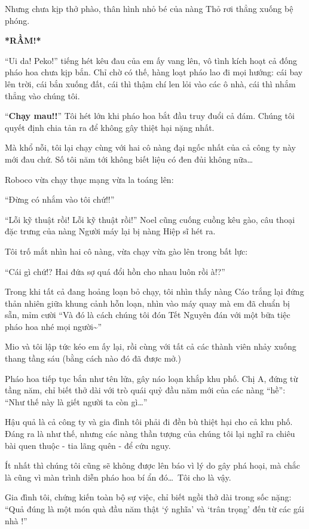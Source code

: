 \documentclass[../main.tex]{subfiles}
\begin{document}
Nhưng chưa kịp thở phào, thân hình nhỏ bé của nàng Thỏ rơi thẳng xuống bệ phóng.

\textbf{*RẦM!*}

``Ui da! Peko!'' tiếng hét kêu đau của em ấy vang lên, vô tình kích hoạt cả đống pháo hoa chưa kịp bắn. Chỉ chờ có thế, hàng loạt pháo lao đi mọi hướng: cái bay lên trời, cái bắn xuống đất, cái thì thậm chí len lỏi vào các ô nhà, cái thì nhắm thẳng vào chúng tôi.

``\textbf{Chạy mau!!}'' Tôi hét lớn khi pháo hoa bắt đầu truy đuổi cả đám. Chúng tôi quyết định chia tản ra để không gây thiệt hại nặng nhất.

Mà khổ nỗi, tôi lại chạy cùng với hai cô nàng đại ngốc nhất của cả công ty này mới đau chứ. Số tôi năm tới không biết liệu có đen đủi không nữa\dots

Roboco vừa chạy thục mạng vừa la toáng lên:

``Đừng có nhắm vào tôi chứ!!''

``Lỗi kỹ thuật rồi! Lỗi kỹ thuật rồi!'' Noel cũng cuống cuồng kêu gào, câu thoại đặc trưng của nàng Người máy lại bị nàng Hiệp sĩ hét ra.

Tôi trố mắt nhìn hai cô nàng, vừa chạy vừa gào lên trong bất lực:

``Cái gì chứ!? Hai đứa sợ quá đổi hồn cho nhau luôn rồi à!?''

Trong khi tất cả đang hoảng loạn bỏ chạy, tôi nhìn thấy nàng Cáo trắng lại đứng thản nhiên giữa khung cảnh hỗn loạn, nhìn vào máy quay mà em đã chuẩn bị sẵn, mỉm cười ``Và đó là cách chúng tôi đón Tết Nguyên đán với một bữa tiệc pháo hoa nhé mọi người\~{}''

Mio và tôi lập tức kéo em ấy lại, rồi cùng với tất cả các thành viên nhảy xuống thang tầng sáu (bằng cách nào đó đã được mở.)

Pháo hoa tiếp tục bắn như tên lửa, gây náo loạn khắp khu phố. Chị A, đứng từ tầng năm, chỉ biết thở dài với trò quái quỷ đầu năm mới của các nàng ``hề'': ``Như thế này là giết người ta còn gì\dots''

Hậu quả là cả công ty và gia đình tôi phải đi đền bù thiệt hại cho cả khu phố. Đáng ra là như thế, nhưng các nàng thần tượng của chúng tôi lại nghĩ ra chiêu bài quen thuộc - tia lãng quên - để cứu nguy.

Ít nhất thì chúng tôi cũng sẽ không được lên báo vì lý do gây phá hoại, mà chắc là cũng vì màn trình diễn pháo hoa bí ẩn đó\dots\ Tôi cho là vậy.

Gia đình tôi, chứng kiến toàn bộ sự việc, chỉ biết ngồi thở dài trong sốc nặng: ``Quả đúng là một món quà đầu năm thật `ý nghĩa' và `trân trọng' đến từ các gái nhà \hll!''
\end{document}

